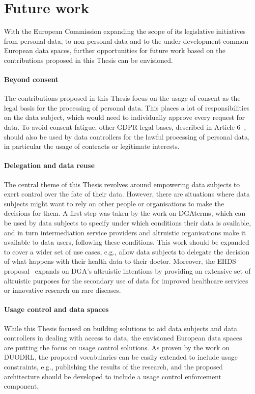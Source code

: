 \section{Future work}
\label{sec:future_work}

With the European Commission expanding the scope of its legislative initiatives from personal data, to non-personal data and to the under-development common European data spaces, further opportunities for future work based on the contributions proposed in this Thesis can be envisioned.

\paragraph{Beyond consent} The contributions proposed in this Thesis focus on the usage of consent as the legal basis for the processing of personal data. This places a lot of responsibilities on the data subject, which would need to individually approve every request for data. To avoid consent fatigue, other GDPR legal bases, described in Article 6~\citeyearpar{noauthor_regulation_2016}, should also be used by data controllers for the lawful processing of personal data, in particular the usage of contracts or legitimate interests.

\paragraph{Delegation and data reuse} The central theme of this Thesis revolves around empowering data subjects to exert control over the fate of their data. However, there are situations where data subjects might want to rely on other people or organisations to make the decisions for them. A first step was taken by the work on DGAterms, which can be used by data subjects to specify under which conditions their data is available, and in turn intermediation service providers and altruistic organisations make it available to data users, following these conditions. This work should be expanded to cover a wider set of use cases, e.g., allow data subjects to delegate the decision of what happens with their health data to their doctor. Moreover, the EHDS proposal~\citeyearpar{noauthor_proposal_2022} expands on DGA's altruistic intentions by providing an extensive set of altruistic purposes for the secondary use of data for improved healthcare services or innovative research on rare diseases.

\paragraph{Usage control and data spaces} While this Thesis focused on building solutions to aid data subjects and data controllers in dealing with access to data, the envisioned European data spaces are putting the focus on usage control solutions. As proven by the work on DUODRL, the proposed vocabularies can be easily extended to include usage constraints, e.g., publishing the results of the research, and the proposed architecture should be developed to include a usage control enforcement component.

